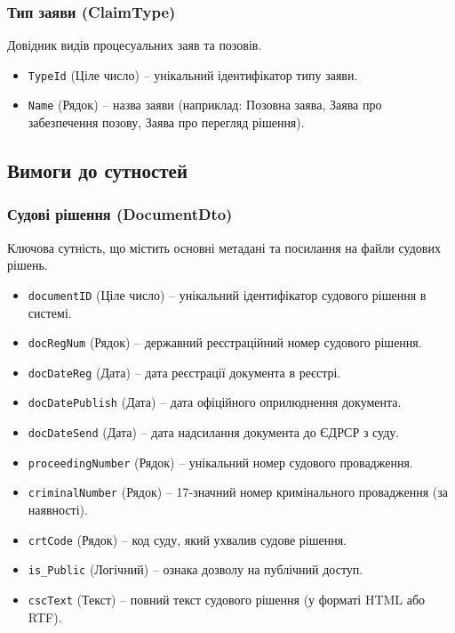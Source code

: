 \documentclass{article}
\begin{document}
\subsubsection{Тип заяви (ClaimType)}
Довідник видів процесуальних заяв та позовів.
\begin{itemize}
    \item \texttt{TypeId} (Ціле число) -- унікальний ідентифікатор типу заяви.
    \item \texttt{Name} (Рядок) -- назва заяви (наприклад: Позовна заява, Заява про забезпечення позову, Заява про перегляд рішення).
\end{itemize}

\newpage
\subsection{Вимоги до сутностей}

\subsubsection{Судові рішення (DocumentDto)}
Ключова сутність, що містить основні метадані та посилання на файли судових рішень.
\begin{itemize}
    \item \texttt{documentID} (Ціле число) -- унікальний ідентифікатор судового рішення в системі.
    \item \texttt{docRegNum} (Рядок) -- державний реєстраційний номер судового рішення.
    \item \texttt{docDateReg} (Дата) -- дата реєстрації документа в реєстрі.
    \item \texttt{docDatePublish} (Дата) -- дата офіційного оприлюднення документа.
    \item \texttt{docDateSend} (Дата) -- дата надсилання документа до ЄДРСР з суду.
    \item \texttt{proceedingNumber} (Рядок) -- унікальний номер судового провадження.
    \item \texttt{criminalNumber} (Рядок) -- 17-значний номер кримінального провадження (за наявності).
    \item \texttt{crtCode} (Рядок) -- код суду, який ухвалив судове рішення.
    \item \texttt{is\_Public} (Логічний) -- ознака дозволу на публічний доступ.
    \item \texttt{cscText} (Текст) -- повний текст судового рішення (у форматі HTML або RTF).
\end{itemize}
\end{document}
